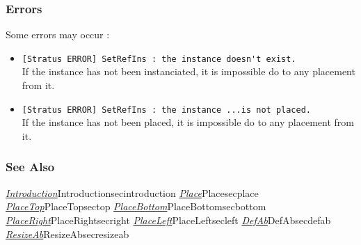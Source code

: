 \subsubsection{Errors}
    
Some errors may occur :
\begin{itemize}
    \item \verb-[Stratus ERROR] SetRefIns : the instance doesn't exist.-\\If the instance has not been instanciated, it is impossible do to any placement from it.
    \item \verb-[Stratus ERROR] SetRefIns : the instance ...is not placed.-\\If the instance has not been placed, it is impossible do to any placement from it.
\end{itemize}
         
\subsubsection{See Also}

\hyperref[ref]{\emph{Introduction}}{}{Introduction}{secintroduction}
\hyperref[ref]{\emph{Place}}{}{Place}{secplace}
\hyperref[ref]{\emph{PlaceTop}}{}{PlaceTop}{sectop}
\hyperref[ref]{\emph{PlaceBottom}}{}{PlaceBottom}{secbottom}
\hyperref[ref]{\emph{PlaceRight}}{}{PlaceRight}{secright}
\hyperref[ref]{\emph{PlaceLeft}}{}{PlaceLeft}{secleft}
\hyperref[ref]{\emph{DefAb}}{}{DefAb}{secdefab}
\hyperref[ref]{\emph{ResizeAb}}{}{ResizeAb}{secresizeab}
